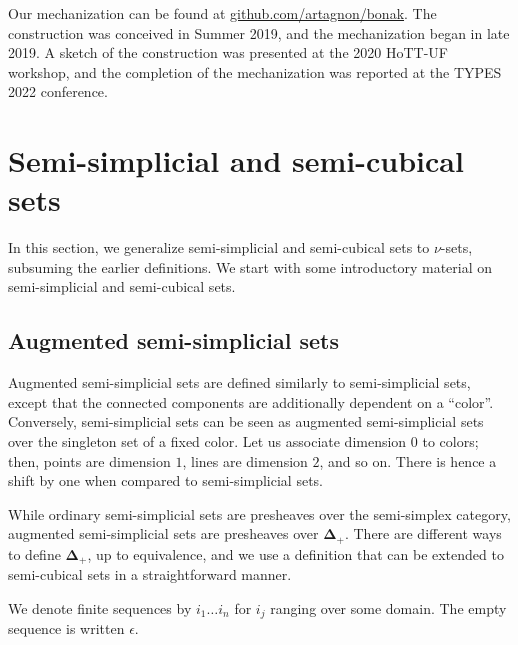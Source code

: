 \documentclass{msc}
\newcommand{\DeltaPlus}{\ensuremath{\boldsymbol{\Delta}_+}}
\begin{document}
Our mechanization can be found at \href{https://github.com/artagnon/bonak}{github.com/artagnon/bonak}. The construction was conceived in Summer 2019, and the mechanization began in late 2019. A sketch of the construction was presented at the 2020 HoTT-UF workshop, and the completion of the mechanization was reported at the TYPES 2022 conference.

\section{Semi-simplicial and semi-cubical sets\label{sec:nu}}
In this section, we generalize semi-simplicial and semi-cubical sets to $\nu$-sets, subsuming the earlier definitions. We start with some introductory material on semi-simplicial and semi-cubical sets.

\subsection*{Augmented semi-simplicial sets}
Augmented semi-simplicial sets are defined similarly to semi-simplicial sets, except that the connected components are additionally dependent on a ``color''. Conversely, semi-simplicial sets can be seen as augmented semi-simplicial sets over the singleton set of a fixed color. Let us associate dimension $0$ to colors; then, points are dimension $1$, lines are dimension $2$, and so on. There is hence a shift by one when compared to semi-simplicial sets.

While ordinary semi-simplicial sets are presheaves over the semi-simplex category, augmented semi-simplicial sets are presheaves over \DeltaPlus. There are different ways to define \DeltaPlus, up to equivalence, and we use a definition that can be extended to semi-cubical sets in a straightforward manner.

\begin{notation}
  We denote finite sequences by $i_1 \ldots i_n$ for $i_j$ ranging over some domain. The empty sequence is written $\epsilon$.
\end{notation}
\end{document}
